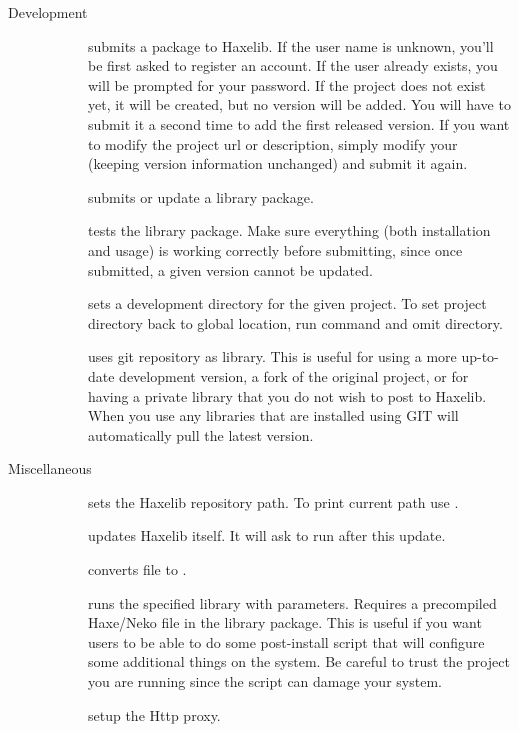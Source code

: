 \begin{description}
	\item[Development]
		\begin{description}
			\item[] submits a package to Haxelib. If the user name is unknown, you'll be first asked to register an account. If the user already exists, you will be prompted for your password. If the project does not exist yet, it will be created, but no version will be added. You will have to submit it a second time to add the first released version. If you want to modify the project url or description, simply modify your  (keeping version information unchanged) and submit it again.
			\item[] submits or update a library package.
			\item[] tests the library package. Make sure everything (both installation and usage) is working correctly before submitting, since once submitted, a given version cannot be updated.
			\item[] sets a development directory for the given project. To set project directory back to global location, run command and omit directory.
			\item[] uses git repository as library. This is useful for using a more up-to-date development version, a fork of the original project, or for having a private library that you do not wish to post to Haxelib. When you use  any libraries that are installed using GIT will automatically pull the latest version.
		\end{description}
		
	\item[Miscellaneous]
		\begin{description}
			\item[] sets the Haxelib repository path. To print current path use .
			\item[] updates Haxelib itself. It will ask to run  after this update.
			\item[] converts  file to .
			\item[] runs the specified library with parameters. Requires  a precompiled Haxe/Neko  file in the library package. This is useful if you want users to be able to do some post-install script that will configure some additional things on the system. Be careful to trust the project you are running since the script can damage your system.
			\item[] setup the Http proxy.
		\end{description}
\end{description}
